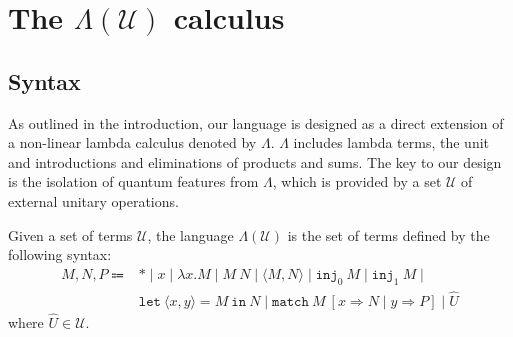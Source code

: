 \section{\texorpdfstring{The $\Lambda(\mathcal{U})$ calculus}{The Lambda(U) calculus}}
\subsection{Syntax}
As outlined in the introduction, our language is designed as a direct extension of a non-linear lambda calculus denoted by $\Lambda$.
$\Lambda$ includes lambda terms, the unit and introductions and eliminations of products and sums.
The key to our design is the isolation of quantum features from $\Lambda$, which is provided by a set $\mathcal{U}$ of external unitary operations.
\begin{dfn}
  Given a set of terms $\mathcal{U}$, the language $\Lambda(\mathcal{U})$ is the set of terms defined by the following syntax:
  \begin{equation*}
    \begin{array}{rl}
      M, N, P \Coloneqq & *\mid x\mid\lambda x. M\mid M\ N\mid\langle M, N\rangle\mid\texttt{inj}_0\ M\mid\texttt{inj}_1\ M \mid \\& \texttt{let}\ \langle x, y\rangle=M\ \texttt{in}\ N\mid\texttt{match}\ M\ [x\Rightarrow N\mid y\Rightarrow P]\mid\hat{U}
    \end{array}
  \end{equation*}
  where $\hat{U}\in\mathcal{U}$.
\end{dfn}

